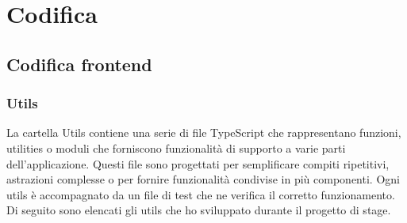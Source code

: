 \chapter{Codifica}\label{cap:codifica}


\section{Codifica frontend}\label{sec:codifica-front-end}

\subsection{Utils}\label{subsec:utils}
La cartella Utils contiene una serie di file TypeScript che rappresentano funzioni, utilities o moduli che forniscono funzionalità di supporto a varie parti dell'applicazione.
Questi file sono progettati per semplificare compiti ripetitivi, astrazioni complesse o per fornire funzionalità condivise in più componenti. Ogni utils è accompagnato 
da un file di test che ne verifica il corretto funzionamento.\\
Di seguito sono elencati gli utils che ho sviluppato durante il progetto di stage.

